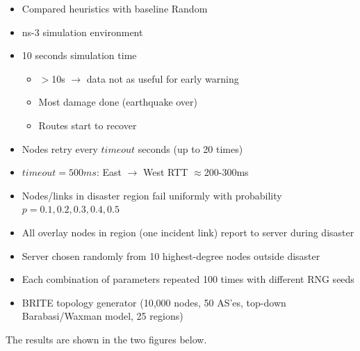 \documentclass[conference]{IEEEtran}
\begin{document}
\begin{itemize}
	\item Compared heuristics with baseline Random
	\item ns-3 simulation environment
	\item 10 seconds simulation time
	\begin{itemize}
		\item $>$10s $\rightarrow$ data not as useful for early warning
		\item Most damage done (earthquake over)
		\item Routes start to recover
	\end{itemize}
	\item Nodes retry every $timeout$ seconds (up to 20 times)
	\item $timeout = 500ms$: East $\rightarrow$ West RTT $\approx$200-300ms
	\item Nodes/links in disaster region fail uniformly with probability $p = 0.1, 0.2, 0.3, 0.4, 0.5$
	\item All overlay nodes in region (one incident link) report to server during disaster
	\item Server chosen randomly from 10 highest-degree nodes outside disaster
	\item Each combination of parameters repeated 100 times with different RNG seeds
	\item BRITE topology generator (10,000 nodes, 50 AS'es, top-down Barabasi/Waxman model, 25 regions)
\end{itemize}

The results are shown in the two figures below.

\newpage
\end{document}
